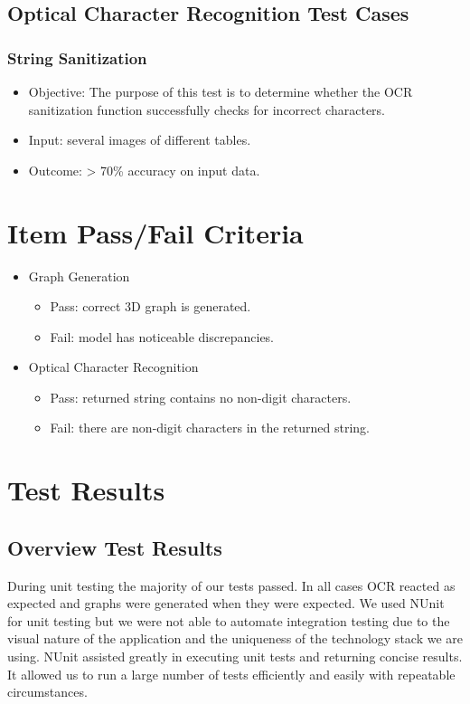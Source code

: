 \documentclass[a4paper,12pt]{article}
\begin{document}
\subsection{Optical Character Recognition Test Cases}
\subsubsection{String Sanitization}
\begin{itemize}
	\item Objective: The purpose of this test is to determine whether the OCR sanitization function successfully checks for incorrect characters.
	\item Input: several images of different tables.
	\item Outcome: > 70\% accuracy on input data.
\end{itemize}

\section{Item Pass/Fail Criteria}
\begin{itemize}
	\item Graph Generation
	\begin{itemize}
		\item Pass: correct 3D graph is generated.
		\item Fail: model has noticeable discrepancies.
	\end{itemize}
	
	\item Optical Character Recognition
	\begin{itemize}
		\item Pass: returned string contains no non-digit characters.
		\item Fail: there are non-digit characters in the returned string.
	\end{itemize}
\end{itemize}

\newpage
\section{Test Results}
\subsection{Overview Test Results}
During unit testing the majority of our tests passed. In all cases OCR reacted as expected and graphs were generated when they were expected. We used NUnit for unit testing but we were not able to automate integration testing due to the visual nature of the application and the uniqueness of the technology stack we are using. NUnit assisted greatly in executing unit tests and returning concise results. It allowed us to run a large number of tests efficiently and easily with repeatable circumstances.
\end{document}
